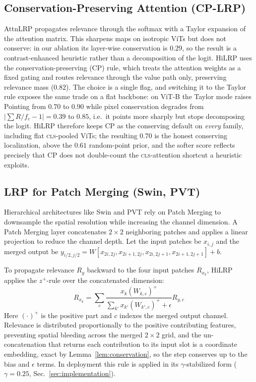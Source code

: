 \documentclass[lettersize,journal]{IEEEtran}
\begin{document}
\subsection{Conservation-Preserving Attention (CP-LRP)}
\label{sec:cp}
AttnLRP propagates relevance through the softmax with a Taylor expansion of the attention matrix. This sharpens maps on isotropic ViTs but does not conserve: in our ablation its layer-wise conservation is $0.29$, so the result is a contrast-enhanced heuristic rather than a decomposition of the logit. HiLRP uses the conservation-preserving (CP) rule, which treats the attention weights as a fixed gating and routes relevance through the value path only, preserving relevance mass ($0.82$). The choice is a single flag, and switching it to the Taylor rule exposes the same trade on a flat backbone: on ViT-B the Taylor mode raises Pointing from $0.70$ to $0.90$ while pixel conservation degrades from $\lvert\sum R/f_c-1\rvert=0.39$ to $0.85$, i.e.\ it points more sharply but stops decomposing the logit. HiLRP therefore keeps CP as the conserving default on \emph{every} family, including flat \textsc{cls}-pooled ViTs; the resulting $0.70$ is the honest conserving localization, above the $0.61$ random-point prior, and the softer score reflects precisely that CP does not double-count the \textsc{cls}-attention shortcut a heuristic exploits.

\subsection{LRP for Patch Merging (Swin, PVT)}
Hierarchical architectures like Swin and PVT rely on Patch Merging to downsample the spatial resolution while increasing the channel dimension. A Patch Merging layer concatenates $2 \times 2$ neighboring patches and applies a linear projection to reduce the channel depth.
Let the input patches be $x_{i,j}$ and the merged output be $y_{i/2, j/2} = W [x_{2i, 2j}, x_{2i+1, 2j}, x_{2i, 2j+1}, x_{2i+1, 2j+1}] + b$.

To propagate relevance $R_y$ backward to the four input patches $R_{x_k}$, HiLRP applies the $z^+$-rule over the concatenated dimension:
\begin{equation}
R_{x_k} = \sum_{c} \frac{x_k (W_{k,c})^+}{\sum_{k'} x_{k'} (W_{k',c})^+ + \epsilon} R_{y, c}
\end{equation}
Here $(\cdot)^{+}$ is the positive part and $c$ indexes the merged output channel. Relevance is distributed proportionally to the positive contributing features, preventing spatial bleeding across the merged $2 \times 2$ grid, and the un-concatenation that returns each contribution to its input slot is a coordinate embedding, exact by Lemma~\ref{lem:conservation}, so the step conserves up to the bias and $\epsilon$ terms. In deployment this rule is applied in its $\gamma$-stabilized form ($\gamma{=}0.25$, Sec.~\ref{sec:implementation}).
\end{document}
